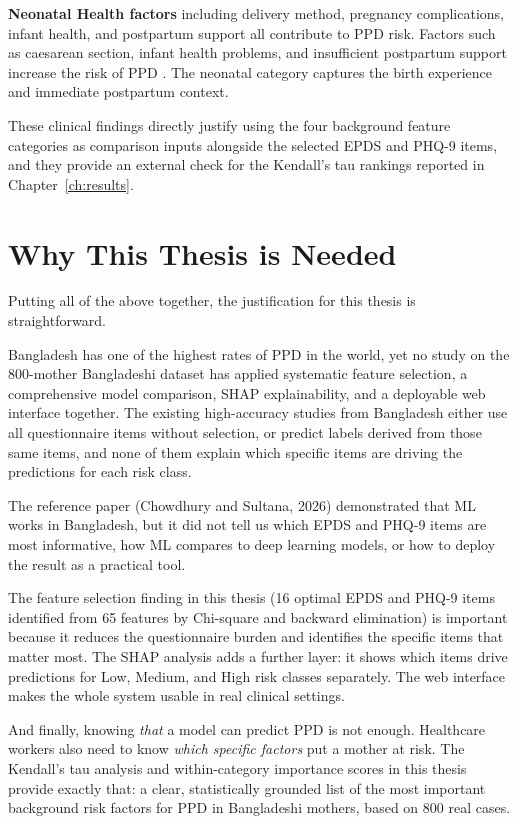 \textbf{Neonatal Health factors} including delivery method, pregnancy complications, infant health, and postpartum support all contribute to PPD risk. Factors such as caesarean section, infant health problems, and insufficient postpartum support increase the risk of PPD \cite{moameri2019cesarean, shirin2024burden}. The neonatal category captures the birth experience and immediate postpartum context.

These clinical findings directly justify using the four background feature categories as comparison inputs alongside the selected EPDS and PHQ-9 items, and they provide an external check for the Kendall's tau rankings reported in Chapter~\ref{ch:results}.

\section{Why This Thesis is Needed}
\label{ch2-sec-justification}

Putting all of the above together, the justification for this thesis is straightforward.

Bangladesh has one of the highest rates of PPD in the world, yet no study on the 800-mother Bangladeshi dataset has applied systematic feature selection, a comprehensive model comparison, SHAP explainability, and a deployable web interface together. The existing high-accuracy studies from Bangladesh either use all questionnaire items without selection, or predict labels derived from those same items, and none of them explain which specific items are driving the predictions for each risk class.

The reference paper (Chowdhury and Sultana, 2026) demonstrated that ML works in Bangladesh, but it did not tell us which EPDS and PHQ-9 items are most informative, how ML compares to deep learning models, or how to deploy the result as a practical tool.

The feature selection finding in this thesis (16 optimal EPDS and PHQ-9 items identified from 65 features by Chi-square and backward elimination) is important because it reduces the questionnaire burden and identifies the specific items that matter most. The SHAP analysis adds a further layer: it shows which items drive predictions for Low, Medium, and High risk classes separately. The web interface makes the whole system usable in real clinical settings.

And finally, knowing \emph{that} a model can predict PPD is not enough. Healthcare workers also need to know \emph{which specific factors} put a mother at risk. The Kendall's tau analysis and within-category importance scores in this thesis provide exactly that: a clear, statistically grounded list of the most important background risk factors for PPD in Bangladeshi mothers, based on 800 real cases.

